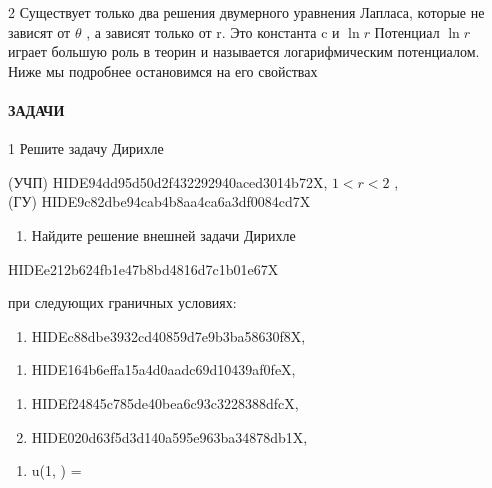 \documentclass[
  ukrainian,
]{article}
\providecommand{\tightlist}{%
  \setlength{\itemsep}{0pt}\setlength{\parskip}{0pt}}
\begin{document}
2 Существует только два решения двумерного уравнения Лапласа, которые не
зависят от \(\theta\) , а зависят только от r. Это константа c и
\(\ln r\) Потенциал \(\ln r\) играет большую роль в теорин и называется
логарифмическим потенциалом. Ниже мы подробнее остановимся на его
свойствах

\paragraph{ЗАДАЧИ}\label{ux437ux430ux434ux430ux447ux438-2}

1 Решите задачу Дирихле

(УЧП) HIDE94dd95d50d2f432292940aced3014b72X, \(1 < r < 2\) ,\\
(ГУ) HIDE9c82dbe94cab4b8aa4ca6a3df0084cd7X

\begin{enumerate}
\def\labelenumi{\arabic{enumi}.}
\setcounter{enumi}{1}
\tightlist
\item
  Найдите решение внешней задачи Дирихле
\end{enumerate}

HIDEe212b624fb1e47b8bd4816d7c1b01e67X

при следующих граничных условиях:

\begin{enumerate}
\def\labelenumi{\alph{enumi})}
\tightlist
\item
  HIDEc88dbe3932cd40859d7e9b3ba58630f8X,
\end{enumerate}

\begin{enumerate}
\def\labelenumi{\arabic{enumi})}
\setcounter{enumi}{5}
\tightlist
\item
  HIDE164b6effa15a4d0aadc69d10439af0feX,
\end{enumerate}

\begin{enumerate}
\def\labelenumi{\Alph{enumi})}
\setcounter{enumi}{1}
\item
  HIDEf24845c785de40bea6c93c3228388dfcX,
\item
  HIDE020d63f5d3d140a595e963ba34878db1X,\\
\end{enumerate}

\begin{enumerate}
\def\labelenumi{\alph{enumi})}
\setcounter{enumi}{17}
\tightlist
\item
  u(1, \theta) =
\end{enumerate}
\end{document}
